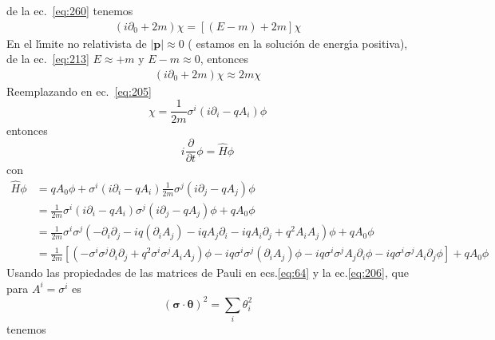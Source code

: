 de la ec.~\eqref{eq:260}  tenemos
\begin{align}
  (i\partial_0+2m)\chi=[(E-m)+2m]\chi
\end{align}
En el l\'\i mite no relativista de $|\mathbf{p}|\approx0$ ( estamos en la soluci\'on de energ\'\i a positiva), de la ec.~\eqref{eq:213} $E\approx+m$ y $E-m\approx0$, entonces
\begin{align}
  (i\partial_0+2m)\chi\approx2m\chi
\end{align}
Reemplazando en ec.~\eqref{eq:205}
\begin{equation}
  \chi=\frac{1}{2m}\sigma^i(i\partial_i-q A_i)\phi
\end{equation}
entonces
\begin{equation}
  i\frac{\partial}{\partial t}\phi=\widehat{H}\phi
\end{equation}
con
\begin{align}
  \widehat{H}\phi&= q A_0\phi+\sigma^i(i\partial_i-q A_i)\frac{1}{2m}\sigma^j(i\partial_j-q A_j)\phi  \nonumber\\
&=\frac{1}{2m}\sigma^i(i\partial_i-q A_i)\sigma^j(i\partial_j-q A_j)\phi+q A_0\phi\nonumber\\
  &=\frac{1}{2m}\sigma^i\sigma^j(-\partial_i\partial_j-i q(\partial_i A_j)-i qA_j\partial_i -i q A_i\partial_j+q^2 A_i A_j)\phi+q A_0\phi\nonumber\\
    &=\frac{1}{2m}\left[(-\sigma^i\sigma^j\partial_i\partial_j+q^2\sigma^i\sigma^jA_i A_j)\phi-i q \sigma^i\sigma^j (\partial_i A_j)\phi
    -i q\sigma^i\sigma^j A_j \partial_i\phi-i q\sigma^i\sigma^j A_i\partial_j\phi\right]+q A_0\phi\nonumber
\end{align}
Usando las propiedades de las matrices de Pauli en ecs.\eqref{eq:64} y la ec.\eqref{eq:206}, que  para $A^i=\sigma^i$ es
\begin{equation}
  (\boldsymbol{\sigma}\cdot\boldsymbol{\theta})^2=\sum_i\theta_i^2
\end{equation}
tenemos

